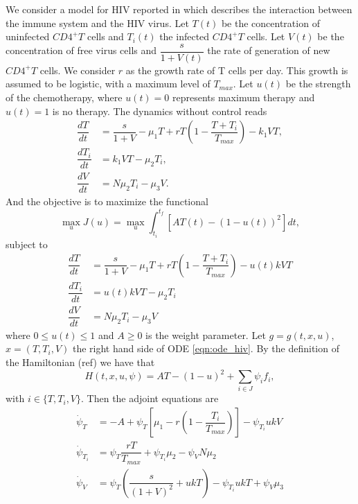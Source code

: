     \noindent  We consider a model for HIV reported in \citep{butler1997optimal} which describes the interaction between the immune system and the HIV virus. Let $T(t)$ be the concentration of uninfected $CD4^{+}T$ cells and $T_i(t)$ the infected $CD4^{+}T$ cells. Let $V(t)$ be the concentration of free virus cells and $\dfrac{s}{1 + V(t)}$ the rate of generation of new $CD4^{+}T$ cells. We consider $r$ as the growth rate of T cells per day. This growth is assumed to be logistic, with a maximum level of $T_{max}$. Let $u(t)$ be the strength of the chemotherapy, where $u(t) = 0$ represents maximum therapy and $u(t) = 1$ is no therapy.
    The dynamics without control reads
    \begin{align*}
        \dfrac{dT}{dt} &= \dfrac{s}{1 + V} - \mu_{1}T + rT \left( 1 - %
                            \dfrac{T + T_{i}}{T_{max}} \right) - k_{1}VT , \\
        \dfrac{dT_{i}}{dt} &= k_{1}VT - \mu_{2}T_{i} , \\
        \dfrac{dV}{dt} &= N \mu_2 T_{i} - \mu_{3}V.
    \end{align*}
    And the objective is to maximize the functional
    $$
        \max_{u} J(u) = \max_{u} \int_{t_i}^{t_f} {\left[ AT(t) - 
                        (1 - u(t))^{2} \right]} dt, 
    $$
    subject to 
    \begin{equation}
    \label{eqn:ode_hiv}
        \begin{aligned}
            \dfrac{dT}{dt} &= \dfrac{s}{1 + V} - \mu_{1}T + rT \left( 1 - %
                \dfrac{T + T_{i}}{T_{max}} \right) - u(t)kVT \\
            \dfrac{dT_{i}}{dt} &= u(t)kVT - \mu_{2}T_{i} \\
            \dfrac{dV}{dt} &= N \mu_2 T_{i} - \mu_{3}V
        \end{aligned}
    \end{equation}
    where $ 0 \leq u(t) \leq 1 $ and $A \geq 0$ is the weight parameter. 
    Let $g =g(t,x,u)$, 
        $x = (T,T_i,V)$ the right hand side of ODE \eqref{eqn:ode_hiv}. 
    By the definition of the Hamiltonian (ref) we have that
    $$
        H(t,x,u,\psi) = AT - (1 - u)^{2} + \sum_{i \in J} \psi_{i}f_{i}, 
    $$
    with $i \in \{T, T_i, V \}$. Then the adjoint equations are
    \begin{align*}
        \dot{\psi}_{T}   
            &=  - A + \psi_{T} \left[\mu_1 
            - r\left(1 - \dfrac{T_i}{T_{max}}\right) \right] - \psi_{T_i} u k V      
            \\ 
        \dot{\psi}_{T_i} &=  \psi_{T}\dfrac{rT}{T_{max}} + 
            \psi_{T_i}\mu_2 - \psi_{V}N\mu_2                      \\
        \dot{\psi}_{V}   &=  \psi_{T} \left(\dfrac{s}{(1+V)^2} + 
            ukT\right) - \psi_{T_i}ukT + \psi_{V}\mu_{3}   
    \end{align*}

